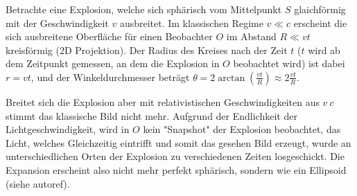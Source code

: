 Betrachte eine Explosion, welche sich sphärisch vom Mittelpunkt \( S \) glaichförmig mit der Geschwindigkeit \( v \) ausbreitet. Im klassischen Regime \( v \ll c \) erscheint die sich ausbreitene Oberfläche für einen Beobachter \( O \) im Abstand \( R \ll vt \) kreisförmig (2D Projektion). Der Radius des Kreises nach der Zeit \( t \) (\( t \) wird ab dem Zeitpunkt gemessen, an dem die Explosion in \( O \) beobachtet wird) ist dabei \( r = vt \), und der Winkeldurchmesser beträgt \( \theta = 2\arctan(\tfrac{vt}{R}) \approx 2\tfrac{vt}{R} \).

Breitet sich die Explosion aber mit relativistischen Geschwindigkeiten aus \( v ~ c \) stimmt das klassische Bild nicht mehr. Aufgrund der Endlichkeit der Lichtgeschwindigkeit, wird in \( O \) kein "Snapshot" der Explosion beobachtet, das Licht, welches Gleichzeitig eintrifft und somit das gesehen Bild erzeugt, wurde an unterschiedlichen Orten der Explosion zu verschiedenen Zeiten losgeschickt. Die Expansion erscheint also nicht mehr perfekt sphärisch, sondern wie ein Ellipsoid (siehe autoref). 





